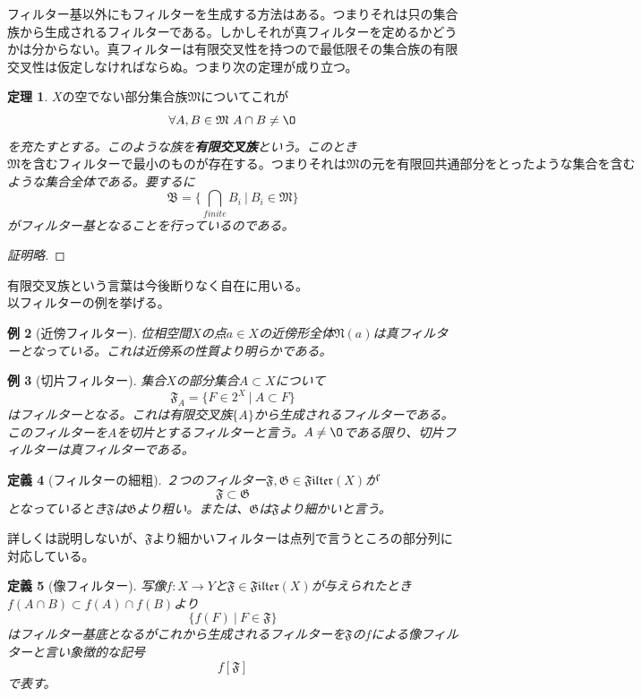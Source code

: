 \documentclass[leqno]{jsarticle}
\newtheorem{thm}{定理}
\newtheorem{df}[thm]{定義}
\newtheorem{exam}[thm]{例}
\newcommand{\ff}{\mathfrak{F}}
\newcommand{\GG}{\mathfrak{G}}
\newcommand{\fil}{\mathfrak{Filter}}
\begin{document}
フィルター基以外にもフィルターを生成する方法はある。つまりそれは只の集合族から生成されるフィルターである。しかしそれが真フィルターを定めるかどうかは分からない。真フィルターは有限交叉性を持つので最低限その集合族の有限交叉性は仮定しなければならぬ。つまり次の定理が成り立つ。
\begin{thm}$Xの空でない部分集合族\mathfrak{M}についてこれが$
\[
\forall A,B\in \mathfrak{M}\ A\cap B\neq \O
\]を充たすとする。このような族を{\bf 有限交叉族}という。このとき$\mathfrak{M}を含むフィルターで最小のものが存在する。つまりそれは\mathfrak{M}の元を有限回共通部分をとったような集合を含む$ような集合全体である。要するに
\[
\mathfrak{B}=\{\bigcap_{finite}B_{i}\ |\ B_{i}\in \mathfrak{M}\}
\]がフィルター基となることを行っているのである。
\end{thm}
\begin{proof}[証明略]
\end{proof}
有限交叉族という言葉は今後断りなく自在に用いる。\\ 
以フィルターの例を挙げる。
\begin{exam}[近傍フィルター]位相空間$X$の点$a\in X$の近傍形全体$\mathfrak{N}(a)$は真フィルターとなっている。これは近傍系の性質より明らかである。

\end{exam}


\begin{exam}[切片フィルター]集合$X$の部分集合$A\subset X$について
\[
\ff_A=\{F\in 2^X\ |\ A\subset F\}
\]はフィルターとなる。これは有限交叉族$\{A \}$から生成されるフィルターである。このフィルターを$A$を切片とするフィルターと言う。$A\neq \O$である限り、切片フィルターは真フィルターである。
\end{exam}


\begin{df}[フィルターの細粗]２つのフィルター$\ff,\GG\in \fil(X)$が
\[
\ff \subset \GG
\]
となっているとき$\ff$は$\GG$より粗い。または、$\GG$は$\ff$より細かいと言う。
\end{df}
詳しくは説明しないが、$\ff$より細かいフィルターは点列で言うところの部分列に対応している。


\begin{df}[像フィルター]写像$f:X\to Y$と$\ff\in \fil(X)$が与えられたとき$f(A\cap B)\subset f(A)\cap f(B)$より
\[
\{f(F)\ |\ F\in\ff\}
\]
はフィルター基底となるがこれから生成されるフィルターを$\ff$の$f$による像フィルターと言い象徴的な記号
\[
f[\ff]
\]
で表す。
\end{df}
\end{document}
